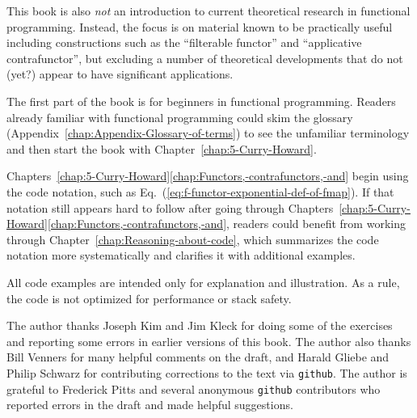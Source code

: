 This book is also \emph{not} an introduction to current theoretical
research in functional programming. Instead, the focus is on material
known to be practically useful \textemdash{} including constructions
such as the \textsf{``}filterable functor\textsf{''} and \textsf{``}applicative contrafunctor\textsf{''},
but excluding a number of theoretical developments that do not (yet?)
appear to have significant applications.

The first part of the book is for beginners in functional programming.
Readers already familiar with functional programming could skim the
glossary (Appendix~\ref{chap:Appendix-Glossary-of-terms}) to see
the unfamiliar terminology and then start the book with Chapter~\ref{chap:5-Curry-Howard}.

Chapters~\ref{chap:5-Curry-Howard}\textendash \ref{chap:Functors,-contrafunctors,-and}
begin using the code notation, such as Eq.~(\ref{eq:f-functor-exponential-def-of-fmap}).
If that notation still appears hard to follow after going through
Chapters~\ref{chap:5-Curry-Howard}\textendash \ref{chap:Functors,-contrafunctors,-and},
readers could benefit from working through Chapter~\ref{chap:Reasoning-about-code},
which summarizes the code notation more systematically and clarifies
it with additional examples.

All code examples are intended only for explanation and illustration.
As a rule, the code is not optimized for performance or stack safety.

The author thanks Joseph Kim and Jim Kleck for doing some of the exercises
and reporting some errors in earlier versions of this book. The author
also thanks Bill Venners for many helpful comments on the draft, and
Harald Gliebe and Philip Schwarz for contributing corrections to the
text via \texttt{github}. The author is grateful to Frederick Pitts
and several anonymous \texttt{github} contributors who reported errors
in the draft and made helpful suggestions.

